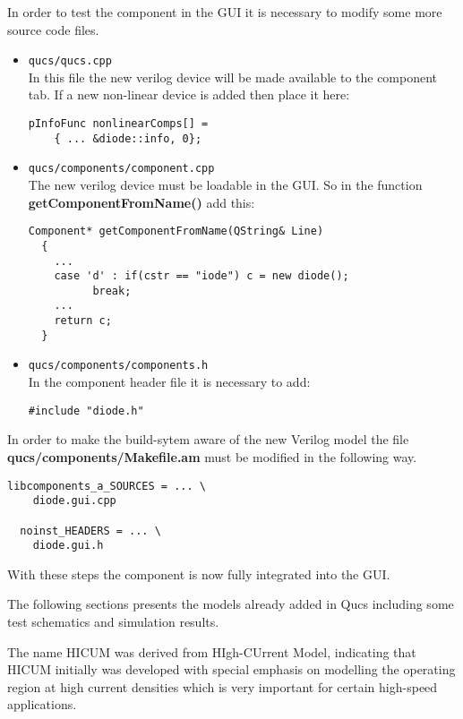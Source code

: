 In order to test the component in the GUI it is necessary to modify
some more source code files.
\begin{itemize}
\item \Verb+qucs/qucs.cpp+\\
In this file the new verilog device will be made available to the
component tab.  If a new non-linear device is added then place it here:
\begin{Verbatim}[fontsize=\small]
  pInfoFunc nonlinearComps[] =
    { ... &diode::info, 0};
\end{Verbatim}
\item \Verb+qucs/components/component.cpp+\\
The new verilog device must be loadable in the GUI.  So in the function
\textbf{getComponentFromName()} add this:
\begin{Verbatim}[fontsize=\small]
  Component* getComponentFromName(QString& Line)
  {
    ...
    case 'd' : if(cstr == "iode") c = new diode();
          break;
    ...
    return c;
  }
\end{Verbatim}
\item \Verb+qucs/components/components.h+\\
In the component header file it is necessary to add:
\begin{Verbatim}[fontsize=\small]
  #include "diode.h"
\end{Verbatim}
\end{itemize}

In order to make the build-sytem aware of the new Verilog model the
file \textbf{qucs/components/Makefile.am} must be modified in the
following way.
\begin{Verbatim}[fontsize=\small]
  libcomponents_a_SOURCES = ... \
    diode.gui.cpp

  noinst_HEADERS = ... \
    diode.gui.h
\end{Verbatim}

With these steps the component is now fully integrated into the GUI.  

\tutsection{Implemented devices}

The following sections presents the models already added in Qucs
including some test schematics and simulation results.


The name HICUM was derived from HIgh-CUrrent Model, indicating that
HICUM initially was developed with special emphasis on modelling the
operating region at high current densities which is very important for
certain high-speed applications.

